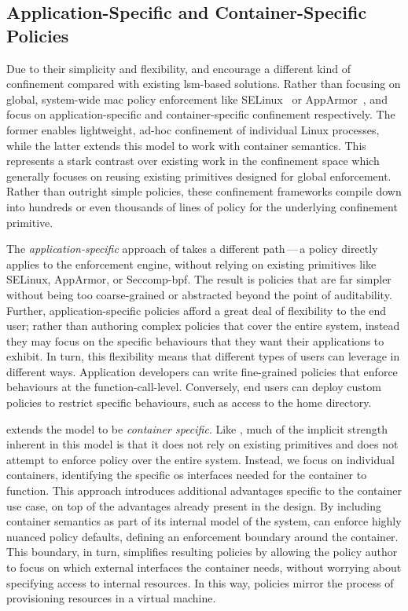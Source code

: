 \subsection{Application-Specific and Container-Specific Policies}

Due to their simplicity and flexibility, \bpfbox{} and \bpfcontain{} encourage a different
kind of confinement compared with existing \gls{lsm}-based solutions. Rather than focusing
on global, system-wide \gls{mac} policy enforcement like
SELinux~\cite{smalley2001_selinux} or AppArmor~\cite{cowan2000_apparmor}, \bpfbox{} and
\bpfcontain{} focus on application-specific and container-specific confinement
respectively. The former enables lightweight, ad-hoc confinement of individual Linux
processes, while the latter extends this model to work with container semantics.  This
represents a stark contrast over existing work in the confinement space which generally
focuses on reusing existing primitives designed for global enforcement.  Rather than
outright simple policies, these confinement frameworks compile down into hundreds or even
thousands of lines of policy for the underlying confinement primitive.

The \textit{application-specific} approach of \bpfbox{} takes a different path\,---\,a
\bpfbox{} policy directly applies to the \bpfbox{} enforcement engine, without relying on
existing primitives like SELinux, AppArmor, or Seccomp-bpf. The result is policies that
are far simpler without being too coarse-grained or abstracted beyond the point of
auditability. Further, application-specific policies afford a great deal of flexibility to
the end user; rather than authoring complex policies that cover the entire system, instead
they may focus on the specific behaviours that they want their applications to exhibit. In
turn, this flexibility means that different types of users can leverage \bpfbox{} in
different ways.  Application developers can write fine-grained policies that enforce
behaviours at the function-call-level.  Conversely, end users can deploy custom \bpfbox{}
policies to restrict specific behaviours, such as access to the home directory.

\bpfcontain{} extends the \bpfbox{} model to be \textit{container specific}. Like
\bpfbox{}, much of the implicit strength inherent in this model is that it does not rely
on existing primitives and does not attempt to enforce policy over the entire system.
Instead, we focus on individual containers, identifying the specific \gls{os} interfaces
needed for the container to function.  This approach introduces additional advantages
specific to the container use case, on top of the advantages already present in the
\bpfbox{} design. By including container semantics as part of its internal model of the
system, \bpfcontain{} can enforce highly nuanced policy defaults, defining an enforcement
boundary around the container. This boundary, in turn, simplifies resulting policies by
allowing the policy author to focus on which external interfaces the container needs,
without worrying about specifying access to internal resources. In this way, \bpfcontain{}
policies mirror the process of provisioning resources in a virtual machine.

